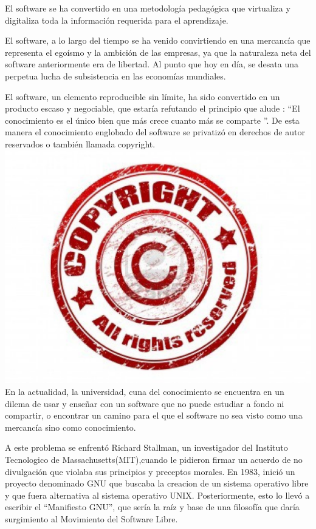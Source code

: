 El software se ha convertido en una metodología pedagógica
que virtualiza y digitaliza toda la información requerida para el
aprendizaje.

El software, a lo largo del tiempo se ha venido convirtiendo en
una mercancía que representa el egoísmo y la ambición de las
empresas, ya que la naturaleza neta del software anteriormente
era de libertad. Al punto que hoy en día, se desata una perpetua
lucha de subsistencia en las economías mundiales.

El software, un elemento reproducible sin límite, ha sido
convertido en un producto escaso y negociable, que estaría
refutando el principio que alude : “El conocimiento es el único
bien que más crece cuanto más se comparte ”. De esta manera
el conocimiento englobado del software se privatizó en derechos
de autor reservados o también llamada copyright.
\includegraphics[scale=0.5]{img/cp06/img0603.png}
En la actualidad, la universidad, cuna del conocimiento se
encuentra en un dilema de usar y enseñar con un software que
no puede estudiar a fondo ni compartir, o encontrar un camino
para el que el software no sea visto como una mercancía sino
como conocimiento.

A este problema se enfrentó Richard Stallman, un investigador
del Instituto Tecnologico de Massachusetts(MIT),cuando le
pidieron firmar un acuerdo de no divulgación que violaba sus
principios y preceptos morales. En 1983, inició un proyecto
denominado GNU que buscaba la creacion de un sistema
operativo libre y que fuera alternativa al sistema operativo
UNIX. Posteriormente, esto lo llevó a escribir el “Manifiesto
GNU”, que sería la raíz y base de una filosofía que daría
surgimiento al Movimiento del Software Libre.

